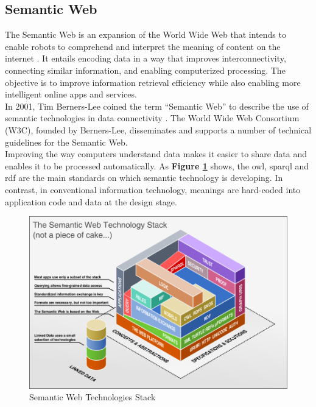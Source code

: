 \subsection{Semantic Web\label{sec:semweb}}
The Semantic Web is an expansion of the World Wide Web that intends to enable robots to comprehend and interpret the meaning of content on the internet \cite{shadbolt2006semantic, berners2023semantic, kim2003semantic}. It entails encoding data in a way that improves interconnectivity, connecting similar information, and enabling computerized processing. The objective is to improve information retrieval efficiency while also enabling more intelligent online apps and services.\\

In 2001, Tim Berners-Lee coined the term “Semantic Web” to describe the use of semantic technologies in data connectivity \cite{berners2023semantic}. The World Wide Web Consortium (W3C), founded by Berners-Lee, disseminates and supports a number of technical guidelines for the Semantic Web.\\

Improving the way computers understand data makes it easier to share data and enables it to be processed automatically. As \textbf{Figure \ref{fig:sem-web-stack}} shows, the \acrfull{owl}, \acrfull{sparql} and \acrfull{rdf} are the main standards on which semantic technology is developing. In contrast, in conventional information technology, meanings are hard-coded into application code and data at the design stage. \\

\begin{figure}[ht]
    \centering
    \includegraphics[scale=0.6]{images/foundation-sem-web-tech-stack.png}
    \caption{\label{fig:sem-web-stack} Semantic Web Technologies Stack \cite{semWebStack} }
\end{figure}


